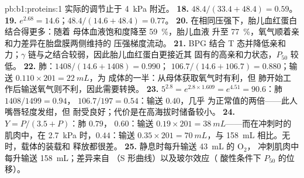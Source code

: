 \begin{solution}{pb:b1:proteins:1}
实际的调节止于 \qty{4}{kPa} 附近。
\textbf{18.} $48.4/(33.4 + 48.4) = 0.59$。
\textbf{19.} $e^{2.68} = 14.6$；$48.4/(14.6 + 48.4) = 0.77$。
\textbf{20.} 在相同压强下，胎儿血红蛋白结合得更多：随着
母体血液饱和度降至 \qty{59}{\%}，胎儿血液
升至 \qty{77}{\%}，氧气顺着亲和力差异在胎盘膜两侧维持的
压强梯度流动。
\textbf{21.} BPG 结合 T 态并降低亲和力；$\gamma$
链与之结合较弱，因此胎儿血红蛋白更接近其
固有的高亲和力状态，$P_{50}$ 较低。
\textbf{22.} 肺：$1408/(14.6 + 1408) = 0.990$； $106.7/(14.6
+ 106.7) = 0.880$；输送 $0.110\times 201 = \qty{22}{mL}$，为
成体的一半：从母体获取氧气时有利，但
肺开始工作后输送氧气则不利，因此需要转换。
\textbf{23.} $5^{2.8} = e^{2.8\times 1.609} = e^{4.51} = 90.6$：肺
$1408/1499 = 0.94$， $106.7/197 = 0.54$：输送 $0.40$，几乎
为正常值的两倍——此人嘴唇轻度发绀，但
耐受良好；代价是在高海拔时储备较小。
\textbf{24.} $Y = P/(3.5 + P)$：肺 $0.79$， $0.60$：输送
$0.19\times 201 = \qty{38}{mL}$——而在冲刺时的肌肉中，在
\qty{2.7}{kPa} 时，$0.44$：输送 $0.35\times 201 = \qty{70}{mL}$，与
\qty{158}{mL} 相比。无时，载体的装载和
释放都很差。
\textbf{25.} 静息时每升输送 \qty{43}{mL} 的 $\mathrm{O_2}$，
冲刺肌肉中每升输送 \qty{158}{mL}；差异来自
（S 形曲线）以及玻尔效应（
酸性条件下 $P_{50}$ 的位移）。
\end{solution}
